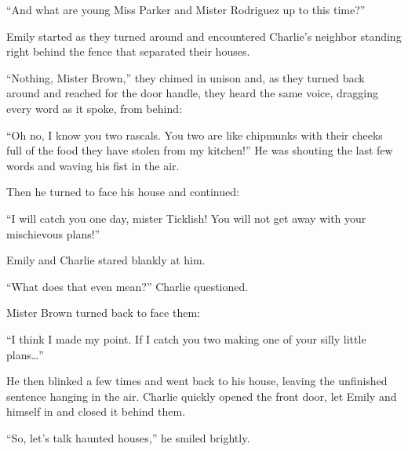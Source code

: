 “And what are young Miss Parker and Mister Rodriguez up to this time?”

Emily started as they turned around and encountered Charlie’s neighbor standing right behind the fence that separated their houses.

“Nothing, Mister Brown,” they chimed in unison and, as they turned back around and reached for the door handle, they heard the same voice, dragging every word as it spoke, from behind:

“Oh no, I know you two rascals. You two are like chipmunks with their cheeks full of the food they have stolen from my kitchen!” He was shouting the last few words and waving his fist in the air.

Then he turned to face his house and continued:

“I will catch you one day, mister Ticklish! You will not get away with your mischievous plans!”

Emily and Charlie stared blankly at him.

“What does that even mean?” Charlie questioned.

Mister Brown turned back to face them:

“I think I made my point. If I catch you two making one of your silly little plans…”

He then blinked a few times and went back to his house, leaving the unfinished sentence hanging in the air. Charlie quickly opened the front door, let Emily and himself in and closed it behind them.

“So, let’s talk haunted houses,” he smiled brightly.